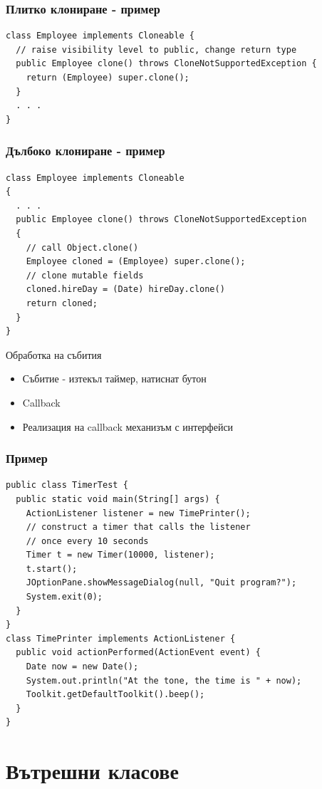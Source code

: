 \documentclass{beamer}
\begin{document}
\begin{frame}[fragile]
  \frametitle{Плитко клониране - пример}
  \transdissolve
\begin{lstlisting}
class Employee implements Cloneable {
  // raise visibility level to public, change return type
  public Employee clone() throws CloneNotSupportedException {
    return (Employee) super.clone();
  }
  . . .
}
\end{lstlisting}
\end{frame}

\begin{frame}[fragile]
  \frametitle{Дълбоко клониране - пример}
  \transdissolve
\begin{lstlisting}
class Employee implements Cloneable
{
  . . .
  public Employee clone() throws CloneNotSupportedException
  {
    // call Object.clone()
    Employee cloned = (Employee) super.clone();
    // clone mutable fields
    cloned.hireDay = (Date) hireDay.clone()
    return cloned;
  }
}  
\end{lstlisting}
\end{frame}

\begin{frame}{Обработка на събития}
  \transdissolve
  \begin{itemize}
  \item Събитие - изтекъл таймер, натиснат бутон
  \item Callback
  \item Реализация на callback механизъм с интерфейси
  \end{itemize}
\end{frame}

\begin{frame}[fragile]
  \frametitle{Пример}
  \transdissolve
\begin{lstlisting}
public class TimerTest {
  public static void main(String[] args) {
    ActionListener listener = new TimePrinter();
    // construct a timer that calls the listener
    // once every 10 seconds
    Timer t = new Timer(10000, listener);
    t.start();
    JOptionPane.showMessageDialog(null, "Quit program?");
    System.exit(0);
  }
}
class TimePrinter implements ActionListener {
  public void actionPerformed(ActionEvent event) {
    Date now = new Date();
    System.out.println("At the tone, the time is " + now);
    Toolkit.getDefaultToolkit().beep();
  }
}
\end{lstlisting}
\end{frame}

\section{Вътрешни класове}
\end{document}

